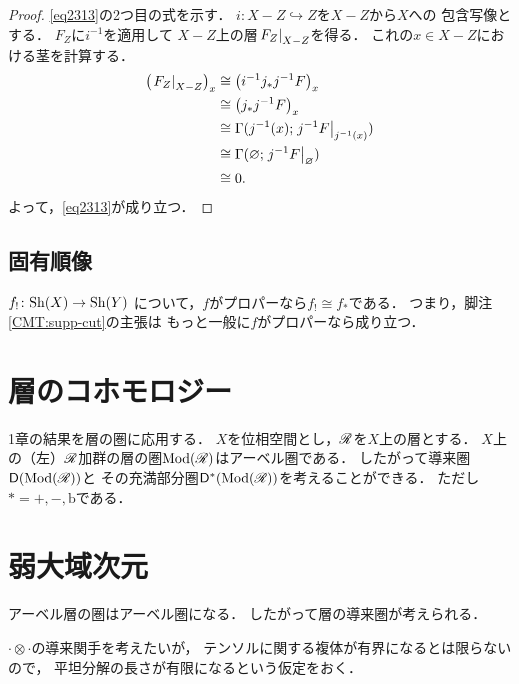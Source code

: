 \begin{proof}
    \eqref{eq2313}の2つ目の式を示す．
    \(i\colon X-Z\hookrightarrow Z\)を\(X-Z\)から\(X\)への
    包含写像とする．
    \(F_Z\)に\(i^{-1}\)を適用して
    \(X-Z\)上の層\(\mres[F_Z]{X-Z}\)を得る．
    これの\(x\in X-Z\)における茎を計算する．
    \begin{align*}
        \left(\mres[F_Z]{X-Z}\right)_x
        &\cong \left(i^{-1}j_{\ast}j^{-1}F\right)_x\\
        &\cong \left(j_{\ast}j^{-1}F\right)_x\\
        &\cong \Gamma(j^{-1}(x);\mres[j^{-1}F]{j^{-1}(x)})\\
        &\cong \Gamma(\varnothing;\mres[j^{-1}F]{\varnothing})\\
        &\cong 0.
    \end{align*}
    よって，\eqref{eq2313}が成り立つ．
\end{proof}


\subsection{固有順像}\label{ssec:pdimg}

\(f_!\colon\Sh(X)\to\Sh(Y)\)
について，\(f\)がプロパーなら\(f_!\cong f_\ast\)である．
つまり，脚注 \ref{CMT:supp-cut}の主張は
もっと一般に\(f\)がプロパーなら成り立つ．



\section{層のコホモロジー}
1章の結果を層の圏に応用する．
\(X\)を位相空間とし，\(\scR\)を\(X\)上の層とする．
\(X\)上の（左）\(\scR\)加群の層の圏\(\Mod(\scR)\)はアーベル圏である．
したがって導来圏\(\Domp(\Mod(\scR))\)と
その充満部分圏\(\Domp^{\ast}(\Mod(\scR))\)を考えることができる．
ただし\(\ast=+,-,\mathrm{b}\)である．
\section*{弱大域次元}
アーベル層の圏はアーベル圏になる．
したがって層の導来圏が考えられる．

\(\cdot\otimes\cdot\)の導来関手を考えたいが，
テンソルに関する複体が有界になるとは限らないので，
平坦分解の長さが有限になるという仮定をおく．

